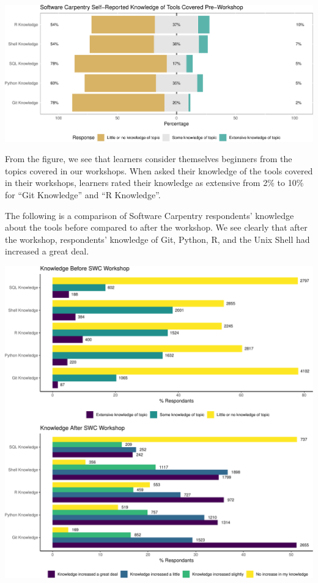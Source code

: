 \documentclass[]{article}
\makeatletter
\def\maxwidth{\ifdim\Gin@nat@width>\linewidth\linewidth\else\Gin@nat@width\fi}
\makeatother
\begin{document}
\includegraphics[width=\maxwidth]{../figures/swc-pre-tools-1}

From the figure, we see that learners consider themselves beginners from
the topics covered in our workshops. When asked their knowledge of the
tools covered in their workshops, learners rated their knowledge as
extensive from 2\% to 10\% for ``Git Knowledge'' and ``R Knowledge''.

The following is a comparison of Software Carpentry respondents'
knowledge about the tools before compared to after the workshop. We see
clearly that after the workshop, respondents' knowledge of Git, Python,
R, and the Unix Shell had increased a great deal.

\includegraphics[width=\maxwidth]{../figures/swc-knowledge-change-1}
\end{document}
